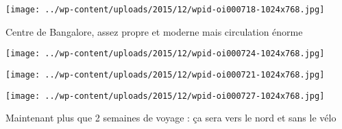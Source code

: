  

 

\begin{center} \texttt{[image: ../wp-content/uploads/2015/12/wpid-oi000718-1024x768.jpg]} \end{center}

 

 Centre de Bangalore, assez propre et moderne mais circulation énorme 

 

\begin{center} \texttt{[image: ../wp-content/uploads/2015/12/wpid-oi000724-1024x768.jpg]} \end{center}

 

 

\begin{center} \texttt{[image: ../wp-content/uploads/2015/12/wpid-oi000721-1024x768.jpg]} \end{center}

 

 

\begin{center} \texttt{[image: ../wp-content/uploads/2015/12/wpid-oi000727-1024x768.jpg]} \end{center}

 

 Maintenant plus que 2 semaines de voyage : ça sera vers le nord et sans le vélo


 
 

